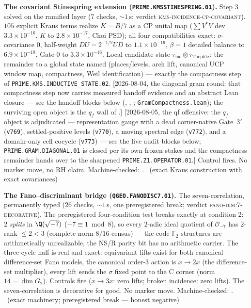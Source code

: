 \documentclass[11pt,a4paper]{article}
\theoremstyle{definition}
\begin{document}
\par\smallskip\noindent\textbf{The covariant Stinespring extension
(\texttt{PRIME.KMSSTINESPRING.01}).}
Step 3 solved on the ramified layer ($7$ checks, ${\sim}1$\,s;
verdict \textsc{kms-incidence-cp-covariant}).  $105$ explicit Kraus
terms realize $K=B/7$ as a CP unital map ($\sum V^*V$ dev
$3.3\times10^{-16}$, $K$ to $2.8\times10^{-17}$, Choi PSD); all
four compatibilities exact: $\sigma$-covariance $0$, half-weight
$DU=2^{-1/2}UD$ to $1.1\times10^{-16}$, $\beta=1$ detailed balance
to $6.9\times10^{-18}$, Gate-0 to $3.3\times10^{-16}$.  Local
candidate state
$\tau_{\mathrm{inc}}\otimes\tau_{\mathrm{Toeplitz}}$; the remainder
to a global state named (places/levels, arch lift, canonical UCP
window map, compactness, Weil identification) --- exactly the
compactness step of \texttt{PRIME.KMS.INDUCTIVE\_STATE.02}.
[2026-08-04, the diagonal gram round: that compactness step now
carries measured handoff evidence and an abstract Lean closure ---
see the handoff blocks below
(,
,
;
\texttt{GramCompactness.lean}); the surviving open object is the
$q_f$ wall of .]
[2026-08-05, the qf offensive: the $q_f$ object is adjudicated ---
representation gauge with a dead corner-native Gate~$3'$
(\texttt{v769}), settled-positive levels (\texttt{v770}), a moving
spectral edge (\texttt{v772}), and a domain-only cell cocycle
(\texttt{v773}) --- see the five audit blocks below;
\texttt{PRIME.GRAM.DIAGONAL.01} is closed per its own frozen
stakes and the compactness remainder hands over to the sharpened
\texttt{PRIME.Z1.OPERATOR.01}.]
Control fires.  No marker move, no RH claim.
Machine-checked: .
\mE\ (exact Kraus construction with exact covariances)
\par\smallskip

\par\smallskip\noindent\textbf{The Fano--discriminant bridge
(\texttt{QGEO.FANODISC7.01}).}
The seven-correlation, permanently typed ($26$ checks, ${\sim}1$\,s,
one preregistered break; verdict \textsc{fano-disc7-decorative}).
The preregistered four-condition test breaks exactly at condition 2:
$2$ \emph{splits} in $\Q(\sqrt{-7})$ ($-7\equiv1\bmod8$), so every
$2$-adic ideal quotient of $\mathcal O_{-7}$ has $2$-rank
$\le2<3$ (complete norm-$8/16$ census) --- the code
$\mathbb{F}_2$-structures are arithmetically unrealizable, the
NS/R parity bit has no arithmetic carrier.  The three-cycle half is
real and exact: equivariant lifts exist for both canonical
difference-set Fano models, the canonical order-$3$ action is
$x\to2x$ (the difference-set multiplier), every lift sends the
$\bar\sigma$ fixed point to the C corner (norm $14=\dim G_2$).
Controls fire ($x\to3x$: zero lifts; broken incidence: zero lifts).
The seven-correlation is decorative for good.  No marker move.
Machine-checked: .
\mE\ (exact machinery; preregistered break --- honest negative)
\par\smallskip
\end{document}
